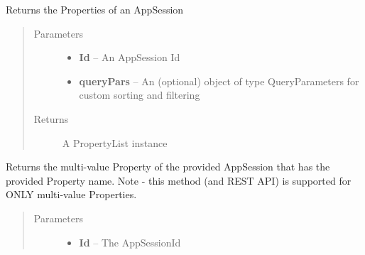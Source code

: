 \documentclass[letterpaper,10pt,english]{sphinxmanual}
\begin{document}
\begin{fulllineitems}
\begin{fulllineitems}
\begin{quote}
\begin{description}
\end{description}\end{quote}

\end{fulllineitems}


\begin{fulllineitems}
\label{Available modules:BaseSpacePy.api.BaseSpaceAPI.BaseSpaceAPI.getAppSessionPropertiesById}
Returns the Properties of an AppSession
\begin{quote}\begin{description}
\item[{Parameters}] \leavevmode\begin{itemize}
\item {} 
\textbf{Id} -- An AppSession Id

\item {} 
\textbf{queryPars} -- An (optional) object of type QueryParameters for custom sorting and filtering

\end{itemize}

\item[{Returns}] \leavevmode
A PropertyList instance

\end{description}\end{quote}

\end{fulllineitems}


\begin{fulllineitems}
\label{Available modules:BaseSpacePy.api.BaseSpaceAPI.BaseSpaceAPI.getAppSessionPropertyByName}
Returns the multi-value Property of the provided AppSession that has the provided Property name.
Note - this method (and REST API) is supported for ONLY multi-value Properties.
\begin{quote}\begin{description}
\item[{Parameters}] \leavevmode\begin{itemize}
\item {} 
\textbf{Id} -- The AppSessionId


\end{itemize}
\end{description}
\end{quote}
\end{fulllineitems}
\end{fulllineitems}
\end{document}
